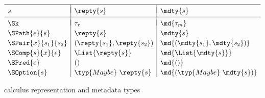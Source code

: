 \begin{figure}
\[
\begin{array}{l|l|l}
\hline
& & \\[-.85em]
s & \repty{s} & \mdty{s} \\[.5ex]
\hline
& & \\[-.85em]
\Sk & \tau_r &  \md{\tau_m} \\[.5ex]
\SPath{e}{s} & \repty{s} & \mdty{s} \\[.5ex]
\SPair{x}{s_1}{s_2} & (\repty{s_1}, \repty{s_2}) & \md{(\mdty{s_1}, \mdty{s_2})} \\[.5ex]
\SComp{s}{x}{e} & \List{\repty{s}} & \md{\List{\mdty{s}}}\\[.5ex]
\SPred{e} & () & \md{()}\\[.5ex]
\SOption{s} & \typ{Maybe}~\repty{s} & \md{(\typ{Maybe}~\mdty{s})} 
\end{array}
\]
\caption{\forest{} calculus representation and metadata types}
\label{fig:ctypes}
\end{figure}

